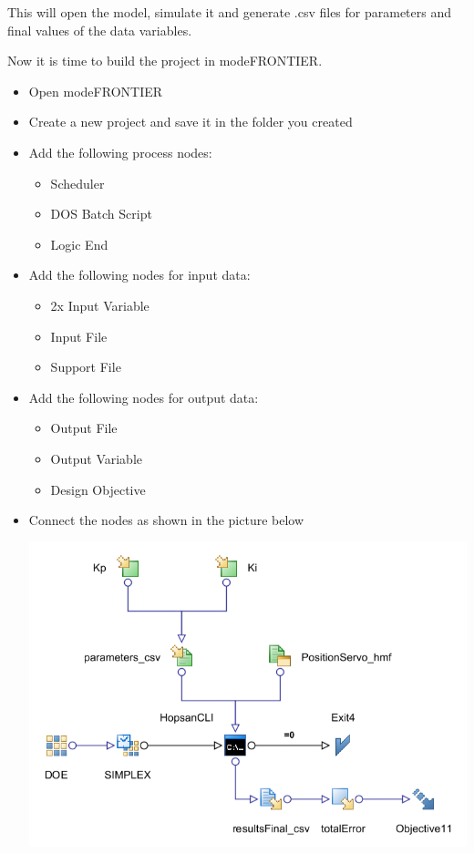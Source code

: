 \documentclass[a4paper]{article}
\begin{document}
\begin{tutenumerate}
This will open the model, simulate it and generate .csv files for parameters and final values of the data variables.


Now it is time to build the project in modeFRONTIER.

\begin{itemize}
\item Open modeFRONTIER
\item Create a new project and save it in the folder you created
\item Add the following process nodes:
\begin{itemize}
\item Scheduler
\item DOS Batch Script
\item Logic End
\end{itemize}
\item Add the following nodes for input data:
\begin{itemize}
\item 2x Input Variable
\item Input File
\item Support File
\end{itemize}
\item Add the following nodes for output data:
\begin{itemize}
\item Output File
\item Output Variable
\item Design Objective
\end{itemize}
\item Connect the nodes as shown in the picture below
\begin{center}
\includegraphics[scale=0.56]{gfx/modefrontier/model_final.png}\\
\end{center}
\end{itemize}



\end{tutenumerate}
\end{document}
